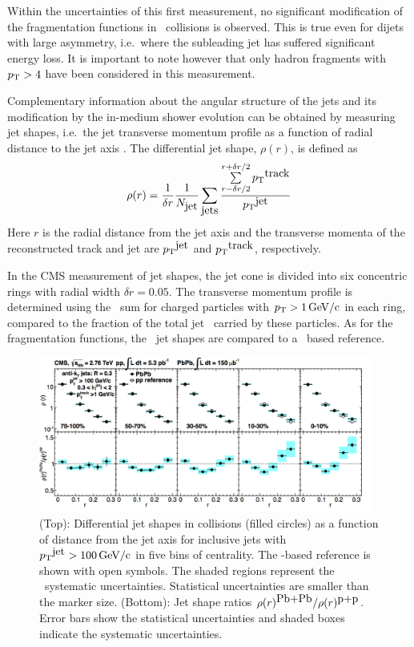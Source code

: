 Within the uncertainties of this first measurement, no significant modification of
the fragmentation functions in \PbPb\ collisions is observed. This is true even for
dijets with large asymmetry, i.e.\ where the subleading jet has suffered significant
energy loss. It is important to note however that only hadron fragments with $\mbox{$p_{\mathrm{T}}$} > 4$\GeVc
have been considered in this measurement.

Complementary information about the angular structure of the jets and its modification
by the in-medium shower evolution can be obtained by measuring jet shapes, i.e.\ the
jet transverse momentum profile as a function of radial distance to the jet axis
\cite{MehtarTani:2010ma,Idilbi:2008vm,CasalderreySolana:2011rz,CasalderreySolana:2011rq,Neufeld:2011yh,Blaizot:2012fh,Fickinger:2013xwa}.
The differential jet shape, $\rho(r)$, is defined as
\begin{equation}
\rho(r) = \frac{1}{\delta r} \frac{1}{N_{\mbox{jet}}} \sum_{\mbox{jets}}
\frac{\sum\limits_{{r - \delta r/2}}^{{r + \delta r/2}}{\mbox{$p_{\mathrm{T}}$}^{\mbox{track}}}}{\mbox{$p_{\mathrm{T}}$}^{\mbox{jet}}}
\label{eq:rho(r)}
\end{equation}
Here $r$ is the radial distance from the jet axis
and the transverse momenta of the reconstructed track and jet are
$\mbox{$p_{\mathrm{T}}$}^{\mbox{jet}}$ and $\mbox{$p_{\mathrm{T}}$}^{\mbox{track}}$, respectively.

In the CMS measurement of jet shapes, the jet cone is divided into six concentric rings
with radial width $\delta r = 0.05$. The transverse momentum profile is determined using
the \pT\ sum for charged particles with $\mbox{$p_{\mathrm{T}}$} > 1\,\mathrm{GeV/c}$ in each ring, compared to
the fraction of the total jet \pT\ carried by these particles. As for the fragmentation
functions, the \PbPb\ jet shapes are compared to a \pp\ based reference.

\begin{figure}[!ht]
\begin{center}
\includegraphics[width=0.98\textwidth]{jetfigures/JetShapes_GR.png}
\caption{\label{fig:JSRatio}
(Top): Differential jet shapes in \PbPb collisions (filled circles)
as a function of distance from the jet axis for inclusive jets with $\mbox{$p_{\mathrm{T}}$}^{\mbox{jet}} >100\,\mathrm{GeV/c}$
in five bins of centrality.  The \pp-based reference is shown with open symbols.
The shaded regions represent the \PbPb\ systematic uncertainties.
Statistical uncertainties are smaller than the marker size.
(Bottom): Jet shape ratios $\rho(r)^{\mbox{Pb+Pb}}/\rho(r)^{\mbox{p+p}}$.
Error bars show the statistical uncertainties and shaded boxes indicate the systematic uncertainties. }
\label{fig:GR:CMS_jetshapes}
\end{center}
\end{figure}

